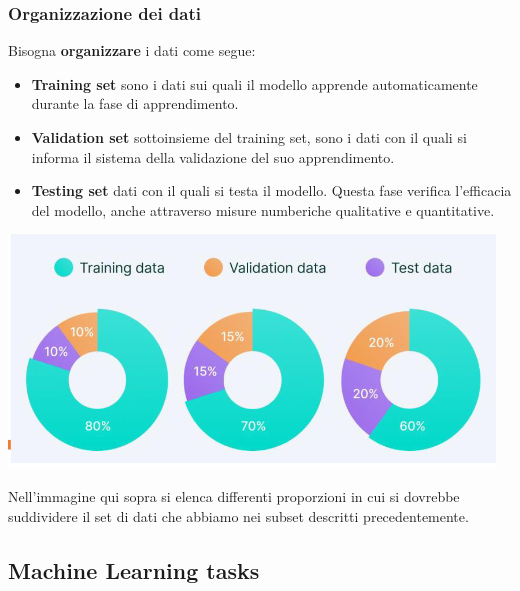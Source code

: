 \subsubsection{Organizzazione dei dati}
Bisogna \textbf{organizzare} i dati come segue: 
\begin{itemize}
    \item \textbf{Training set} sono i dati sui quali il modello 
%
    apprende automaticamente durante la fase di apprendimento.
    \item \textbf{Validation set} sottoinsieme del training set, 
%
    sono i dati con il quali si informa il sistema della 
%
    validazione del suo apprendimento.
    \item \textbf{Testing set} dati con il quali si testa il 
%
    modello. Questa fase verifica l'efficacia del modello, anche
%
    attraverso misure numberiche qualitative e quantitative.
\end{itemize}
\begin{center}
    \includegraphics[scale=0.7]{images/Organizzazione_dei_dati.png}
\end{center}
Nell'immagine qui sopra si elenca differenti proporzioni in cui 
%
si dovrebbe suddividere il set di dati che abbiamo nei subset 
%
descritti precedentemente.
\subsection{Machine Learning tasks}

